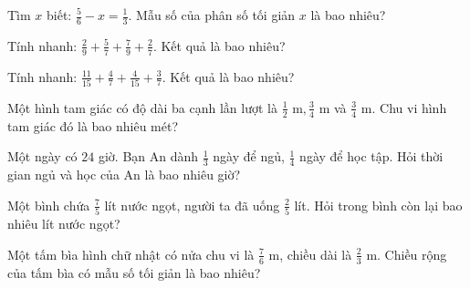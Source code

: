 \begin{ex}
  Tìm $x$ biết: $\frac{5}{6} - x = \frac{1}{3}$. Mẫu số của phân số tối giản $x$ là bao nhiêu?
\end{ex}

\begin{ex}
  Tính nhanh: $\frac{2}{9} + \frac{5}{7} + \frac{7}{9} + \frac{2}{7}$. Kết quả là bao nhiêu?
\end{ex}

\begin{ex}
  Tính nhanh: $\frac{11}{15} + \frac{4}{7} + \frac{4}{15} + \frac{3}{7}$. Kết quả là bao nhiêu?
\end{ex}

\begin{ex}
  Một hình tam giác có độ dài ba cạnh lần lượt là $\frac{1}{2}\text{ m}, \frac{3}{4}\text{ m}$ và $\frac{3}{4}\text{ m}$. Chu vi hình tam giác đó là bao nhiêu mét?
\end{ex}

\begin{ex}
  Một ngày có $24$ giờ. Bạn An dành $\frac{1}{3}$ ngày để ngủ, $\frac{1}{4}$ ngày để học tập. Hỏi thời gian ngủ và học của An là bao nhiêu giờ?
\end{ex}

\begin{ex}
  Một bình chứa $\frac{7}{5}$ lít nước ngọt, người ta đã uống $\frac{2}{5}$ lít. Hỏi trong bình còn lại bao nhiêu lít nước ngọt?
\end{ex}

\begin{ex}
  Một tấm bìa hình chữ nhật có nửa chu vi là $\frac{7}{6}\text{ m}$, chiều dài là $\frac{2}{3}\text{ m}$. Chiều rộng của tấm bìa có mẫu số tối giản là bao nhiêu?
\end{ex}

